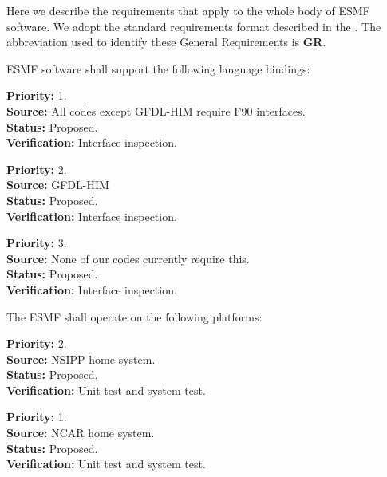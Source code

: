 
Here we describe the requirements that apply to the whole body of 
ESMF software.  We adopt the standard requirements format described in 
the .  The abbreviation used to identify
these General Requirements is {\bf GR}.

ESMF software shall support the following language bindings:

\begin{reqlist}
{\bf Priority:} 1. \\
{\bf Source:} All codes except GFDL-HIM require F90 interfaces. \\
{\bf Status:} Proposed. \\
{\bf Verification:} Interface inspection. 
\end{reqlist}

\begin{reqlist}
{\bf Priority:} 2. \\
{\bf Source:} GFDL-HIM \\
{\bf Status:} Proposed. \\
{\bf Verification:} Interface inspection. 
\end{reqlist}

\begin{reqlist}
{\bf Priority:} 3. \\
{\bf Source:} None of our codes currently require this. \\
{\bf Status:} Proposed. \\
{\bf Verification:} Interface inspection.
\end{reqlist}

The ESMF shall operate on the following platforms:

\begin{reqlist}
{\bf Priority:} 2. \\
{\bf Source:} NSIPP home system. \\
{\bf Status:} Proposed. \\
{\bf Verification:} Unit test and system test.
\end{reqlist}

\begin{reqlist}
{\bf Priority:} 1. \\
{\bf Source:} NCAR home system. \\
{\bf Status:} Proposed. \\
{\bf Verification:} Unit test and system test.
\end{reqlist}

